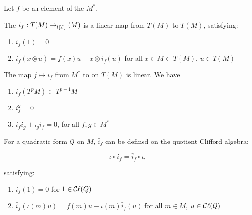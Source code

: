 \begin{definition}

    Let $f$ be an element of the  $M^{*}$.

    The  $i_{f} : T(M) \to_{l[T]}(M)$ is a linear map from $T(M)$ to $T(M)$, satisfying:

    \begin{enumerate}

    \item $i_{f}(1) = 0$
    
    \item $i_{f}(x \otimes u) = f(x) u-x \otimes i_{f}(u)$ for all $x \in M \subset T(M)$, $u \in T(M)$
    
    \end{enumerate}

    The map $f \mapsto i_{f}$ from $M^{*}$ to  on $T(M)$ is linear. We have

    \begin{enumerate}

    \item $i_{f}\left( T^{p} M \right) \subset T^{p-1} M$
    
    \item $i_{f}^{2} = 0$
    
    \item $i_{f} i_{g} + i_{g} i_{f} = 0$, for all $f, g \in M^{*}$
    
    \end{enumerate}

    For a quadratic form $Q$ on $M$,
    $\bar{i}_{f}$ can be defined on the quotient Clifford algebra:

    $$
    \iota \circ i_{f} = \bar{i}_{f} \circ \iota,
    $$

    satisfying:

    \begin{enumerate}

    \item $\bar{i}_{f}(1) = 0$ for $1 \in \mathop{\mathcal{C}\ell}(Q)$

    \item $\bar{i}_{f}\left( \iota(m) u \right) = f(m) u - \iota(m) \bar{i}_{f}(u)$ for all  $m \in M$, $u \in \mathop{\mathcal{C}\ell}(Q)$
    
    \end{enumerate}


\end{definition}
